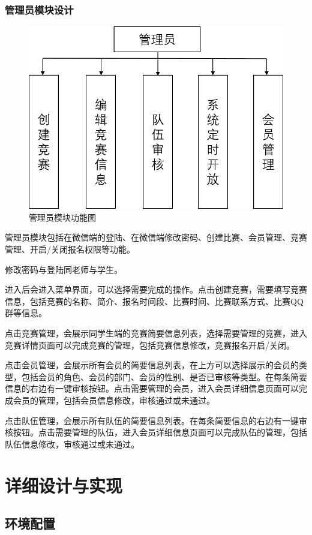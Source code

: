 \documentclass[a4paper]{ltxdoc}
\begin{document}
{		\subsubsection{管理员模块设计}
		\begin{figure}[H]
			\centering
			\includegraphics[width=0.7\linewidth]{images/1-1.png}
			\caption{管理员模块功能图}
		\end{figure}
		管理员模块包括在微信端的登陆、在微信端修改密码、创建比赛、会员管理、竞赛管理、开启/关闭报名权限等功能。
		
		修改密码与登陆同老师与学生。
		
		进入后会进入菜单界面，可以选择需要完成的操作。点击创建竞赛，需要填写竞赛信息，包括竞赛的名称、简介、报名时间段、比赛时间、比赛联系方式、比赛QQ群等信息。
		
		点击竞赛管理，会展示同学生端的竞赛简要信息列表，选择需要管理的竞赛，进入竞赛详情页面可以完成竞赛的管理，包括竞赛信息修改，竞赛报名开启/关闭。
		
		点击会员管理，会展示所有会员的简要信息列表，在上方可以选择展示的会员的类型，包括会员的角色、会员的部门、会员的性别、是否已审核等类型。在每条简要信息的右边有一键审核按钮。点击需要管理的会员，进入会员详细信息页面可以完成会员的管理，包括会员信息修改，审核通过或未通过。
		
		点击队伍管理，会展示所有队伍的简要信息列表。在每条简要信息的右边有一键审核按钮。点击需要管理的队伍，进入会员详细信息页面可以完成队伍的管理，包括队伍信息修改，审核通过或未通过。
		
		\section{详细设计与实现}
		
		\subsection{环境配置}
}
\end{document}
